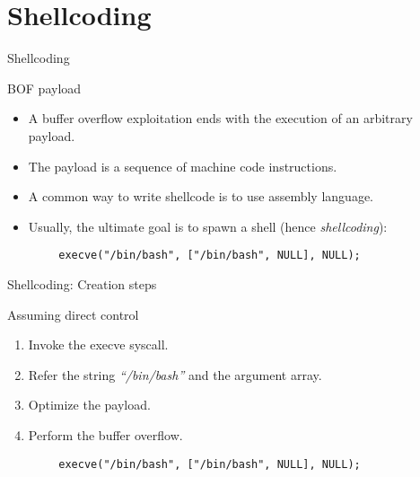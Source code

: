 \section{Shellcoding}
\begin{frame}[fragile]{Shellcoding}
	\begin{block}{BOF payload}
		\begin{itemize}
			\item A buffer overflow exploitation ends with the execution of an arbitrary payload.
			\item The payload is a sequence of machine code instructions.
			\item A common way to write shellcode is to use assembly language.
			\item Usually, the ultimate goal is to spawn a shell (hence \emph{shellcoding}):
		\end{itemize}
	\end{block}
	\ccode
	\begin{lstlisting}
		execve("/bin/bash", ["/bin/bash", NULL], NULL);
	\end{lstlisting}
\end{frame}

\begin{frame}[fragile]{Shellcoding: Creation steps}
	\begin{block}{Assuming direct control}
		\begin{enumerate}
			\item Invoke the execve syscall.
			\item Refer the string \emph{``/bin/bash''} and the argument array.
			\item Optimize the payload.
			\item Perform the buffer overflow.
		\end{enumerate}
	\end{block}
	\ccode
	\begin{lstlisting}
		execve("/bin/bash", ["/bin/bash", NULL], NULL);
	\end{lstlisting}
\end{frame}

